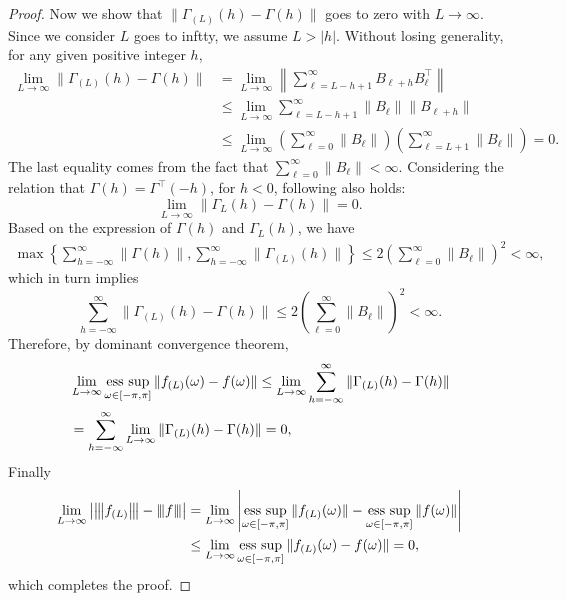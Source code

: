 \begin{lem}
\begin{proof}
Now we show that $\|\Gamma_{(L)}(h) - \Gamma(h)\|$ goes to zero with $L\rightarrow \infty$. Since we consider $L$ goes to inftty, we assume $L>|h|$. Without losing generality, for any given positive integer $h$, 
\begin{equation*}
\begin{aligned}
\lim_{L\rightarrow \infty}\|\Gamma_{(L)}(h) - \Gamma(h)\|& = \lim_{L\rightarrow \infty} \left\|\sum_{\ell= L - h +1}^\infty B_{\ell+h} B_{\ell}^\top \right\| \\ 
&\le \lim_{L\rightarrow \infty}\sum_{\ell=L-h+1}^\infty \|B_\ell\|  \|B_{\ell+h}\|\\ 
&\le \lim_{L\rightarrow \infty} \left(\sum_{\ell=0}^\infty \|B_{\ell}\|\right) \left(\sum_{\ell=L+1}^\infty \|B_{\ell}\|\right)  =0.
\end{aligned}
\end{equation*}
The last equality comes from the fact that $\sum_{\ell=0}^\infty \|B_\ell\|<\infty$. 
Considering the relation that $\Gamma(h)=\Gamma^\top(-h)$, for $h<0$, following also holds: 
\begin{equation}
\lim_{L\rightarrow \infty} \|\Gamma_{L}(h)-\Gamma(h)\| = 0.
\end{equation}
Based on the expression of $\Gamma(h)$ and $\Gamma_L(h)$, we have
\begin{equation*}
\begin{aligned}
\max\left\{\sum_{h=-\infty}^\infty \|\Gamma(h)\|, \sum_{h=-\infty}^\infty\|\Gamma_{(L)}(h)\|\right\}\le 2(\sum_{\ell=0}^\infty \|B_\ell\|)^2<\infty,
\end{aligned}
\end{equation*}
which in turn implies 
\begin{equation}
\label{eq:autocovariance_dct}
\sum_{h=-\infty}^\infty \|\Gamma_{(L)}(h) - \Gamma(h)\| \le 2(\sum_{\ell=0}^\infty \|B_\ell\|)^2<\infty.
\end{equation}
Therefore, by dominant convergence theorem, 
\begin{equation*}
\begin{aligned}
&\lim_{L\rightarrow \infty}\esssup_{\omega\in [-\pi, \pi]}\|f_{(L)}(\omega)-f(\omega)\|\le \lim_{L\rightarrow \infty}\sum_{h=-\infty}^\infty \|\Gamma_{(L)}(h)-\Gamma(h)\|\\
& = \sum_{h=-\infty}^\infty  \lim_{L\rightarrow \infty}  \|\Gamma_{(L)}(h)-\Gamma(h)\| = 0,
\end{aligned}
\end{equation*}
Finally
\begin{equation*}
\begin{aligned}
\lim_{L\rightarrow \infty}\left|\vertiii{f_{(L)}} - \vertiii{f}\right| &=\lim_{L\rightarrow \infty} \left|\esssup_{\omega\in [-\pi, \pi] }\|f_{(L)}(\omega)\|-\esssup_{\omega\in [-\pi, \pi] }\|f(\omega)\| \right|\\
&\le \lim_{L\rightarrow \infty} \esssup_{\omega \in [-\pi, \pi]}\|f_{(L)}(\omega)-f(\omega)\| =0, 
\end{aligned}
\end{equation*}
which completes the proof.  
\end{proof}
\end{lem}
